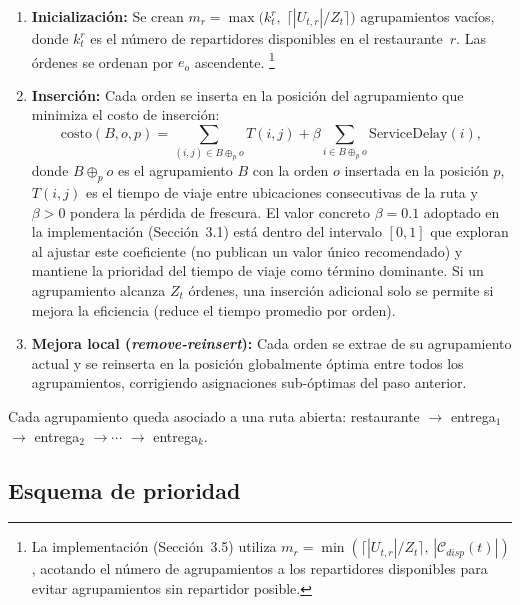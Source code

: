\documentclass[12pt,letterpaper,oneside]{book}
\begin{document}
	\begin{enumerate}
		\item \textbf{Inicialización:} Se crean $m_r = \max\!\bigl(k^r_t,\;
		      \lceil |U_{t,r}| / Z_t \rceil\bigr)$ agrupamientos vacíos, donde
		      $k^r_t$ es el número de repartidores disponibles en el restaurante~$r$.
		      Las órdenes se ordenan por $e_o$ ascendente.%
		      \footnote{La implementación (Sección~3.5) utiliza
		      $m_r = \min(\lceil |U_{t,r}|/Z_t\rceil,\, |\mathcal{C}_{disp}(t)|)$,
		      acotando el número de agrupamientos a los repartidores disponibles
		      para evitar agrupamientos sin repartidor posible.}

		\item \textbf{Inserción:} Cada orden se inserta en la posición del
		      agrupamiento que minimiza el costo de inserción:
		      \begin{equation}
		          \text{costo}(B, o, p) = \sum_{(i,j)\in B \oplus_p o} T(i,j) + \beta \sum_{i \in B \oplus_p o} \text{ServiceDelay}(i),
		      \end{equation}
		      donde $B \oplus_p o$ es el agrupamiento $B$ con la orden $o$ insertada en la posición $p$, $T(i,j)$ es el tiempo de viaje entre ubicaciones consecutivas
		      de la ruta y $\beta > 0$ pondera la pérdida de frescura.  El
		      valor concreto $\beta = 0{.}1$ adoptado en la implementación
		      (Sección~3.1) está dentro del intervalo $[0, 1]$ que
		      \citet{Reyes2018} exploran al ajustar este coeficiente (no
		      publican un valor único recomendado) y mantiene la prioridad del
		      tiempo de viaje como término dominante.  Si un
		      agrupamiento alcanza $Z_t$ órdenes, una inserción adicional solo se
		      permite si mejora la eficiencia (reduce el tiempo promedio por
		      orden).

		\item \textbf{Mejora local (\textit{remove-reinsert}):} Cada orden se
		      extrae de su agrupamiento actual y se reinserta en la posición
		      globalmente óptima entre todos los agrupamientos, corrigiendo
		      asignaciones sub-óptimas del paso anterior.
	\end{enumerate}

	Cada agrupamiento queda asociado a una ruta abierta: restaurante
	$\to$ entrega$_1$ $\to$ entrega$_2$ $\to \cdots$ $\to$ entrega$_k$.

	\subsection{Esquema de prioridad}
\end{document}
